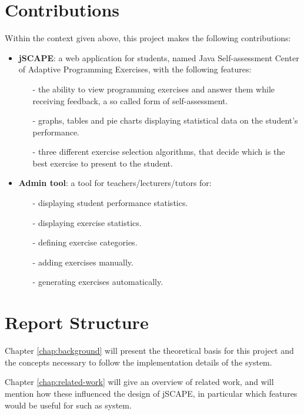 \section{Contributions}
Within the context given above, this project makes the following contributions:
\begin{itemize}
\item \textbf{jSCAPE}: a web application for students, named Java Self-assessment Center of Adaptive Programming Exercises, with the following features:
      \begin{itemize}
      \item[-] the ability to view programming exercises and answer them while receiving feedback, a so called form of self-assessment.
      \item[-] graphs, tables and pie charts displaying statistical data on the student's performance.
      \item[-] three different exercise selection algorithms, that decide which is the best exercise to present to the student.
      \end{itemize}
\item \textbf{Admin tool}: a tool for teachers/lecturers/tutors for:
      \begin{itemize}
      \item[-] displaying student performance statistics.
      \item[-] displaying exercise statistics.
      \item[-] defining exercise categories.
      \item[-] adding exercises manually.
      \item[-] generating exercises automatically.
      \end{itemize}
\end{itemize}

\section{Report Structure}
Chapter \ref{chap:background} will present the theoretical basis for this project and the concepts necessary to follow the implementation details of the system.\newline

Chapter \ref{chap:related-work} will give an overview of related work, and will mention how these influenced the design of jSCAPE, in particular which features would be useful for such as system.\newline

